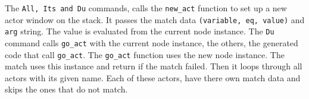 The \texttt{All,\ Its\ and\ Du} commands, calls the \texttt{new\_act}
function to set up a new actor window on the stack. It passes the match
data \texttt{(variable,\ eq,\ value)} and \texttt{arg} string. The value
is evaluated from the current node instance. The \texttt{Du} command
calls \texttt{go\_act} with the current node instance, the others, the
generated code that call \texttt{go\_act}. The \texttt{go\_act} function
uses the new node instance. The match uses this instance and return if
the match failed. Then it loops through all actors with its given name.
Each of these actors, have there own match data and skips the ones that
do not match.
